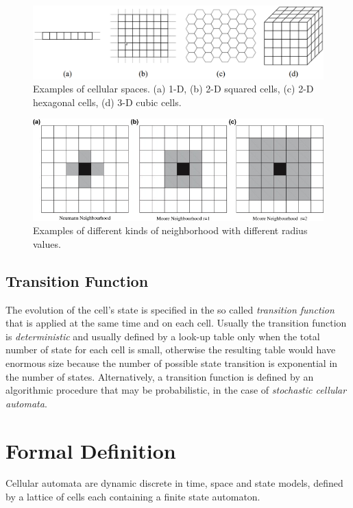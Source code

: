 \begin{figure}
	\centering
	\caption{Examples of cellular spaces. (a) 1-D, (b) 2-D squared cells,
		(c) 2-D hexagonal cells, (d) 3-D cubic cells.}\label{spazioCellulare}
	\includegraphics[scale=0.23]{./images/CA_FDM/spazioCellulare}
\end{figure}

\begin{figure}
\centering
\caption{Examples of different kinds of neighborhood with
different radius values.}\label{mooreNeigh}
\includegraphics[width=1.0\textwidth]{./images/CA_FDM/mooreNeigh}
\end{figure}

\subsection{Transition Function}
The evolution of the cell's state is specified in the so called \textit{transition function} that is applied at the same time and on each cell. Usually the transition function is \textit{deterministic} and usually defined by a look-up table only when the total number of state for each cell is small, otherwise the resulting table would have enormous size because the number of possible state transition is exponential in the number of states. Alternatively, a transition function is defined by an algorithmic procedure that may be probabilistic, in the case of \textit{stochastic cellular automata}\cite{Arrighi:2013:SCA:2637657.2637659}.

\section{Formal Definition}
Cellular automata are dynamic discrete in time, space and state models, defined by a lattice of cells each containing a finite state automaton.

